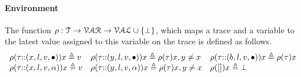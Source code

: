 \paragraph*{Environment}
The function $\rho : {\mathcal{T}} \to \mathcal{VAR} \to \mathcal{VAL} \cup \{\bot\}$, which maps a trace and a variable to the latest value assigned to this variable on the trace is defined as follows.
\[
\begin{array}{lll}
\rho(\mathtt{\tau} {\small ::} (x, l, v, \bullet)) x \triangleq v
&
\rho(\mathtt{\tau} {\small ::} (y, l, v, \bullet)) x \triangleq \rho(\mathtt{\tau}) x, y \neq x
&
\rho(\mathtt{\tau} {\small ::} (b, l, v, \bullet)) x \triangleq \rho(\mathtt{\tau}) x
\\
\rho(\mathtt{\tau} {\small ::} (x, l, v, \alpha)) x \triangleq v
&
\rho(\mathtt{\tau} {\small ::} (y, l, v, \alpha)) x \triangleq \rho(\mathtt{\tau}) x, y \neq x
&
\rho({[]} ) x \triangleq \bot
\end{array}
\]

